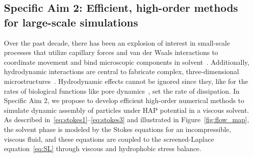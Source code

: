 \subsection{Specific Aim 2: Efficient, high-order methods for
large-scale simulations}
Over the past decade, there has been an explosion of interest in
small-scale processes that utilize capillary forces and van der Waals
interactions to coordinate movement and bind microscopic components in
solvent~\cite{Pandey2011, Zhang2017, Siontorou2017}. Additionally,
hydrodynamic interactions are central to fabricate complex,
three-dimensional microstructures~\cite{Dasgupta2017, Leong2007,
Reynolds2019, Cho2010}. Hydrodynamic effects cannot be ignored since
they, like for the rates of biological functions like pore
dynamics~\cite{RYHAM20112929}, set the rate of dissipation. In Specific
Aim 2, we propose to develop efficient high-order numerical methods to
simulate dynamic assembly of particles under HAP potential in a viscous
solvent. As described in~\eqref{eq:stokes1}--\eqref{eq:stokes3} and
illustrated in Figure~\ref{fig:flow_map}, the solvent phase is modeled
by the Stokes equations for an incompressible, viscous fluid, and these
equations are coupled to the screened-Laplace equation~\eqref{eq:SL}
through viscous and hydrophobic stress balance. 
 
